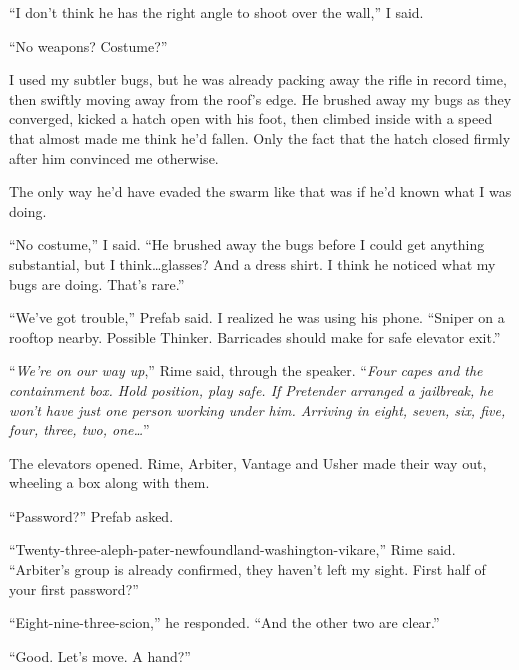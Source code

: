 ``I don't think he has the right angle to shoot over the wall,'' I said.



``No weapons?  Costume?''



I used my subtler bugs, but he was already packing away the rifle in record time, then swiftly moving away from the roof's edge.  He brushed away my bugs as they converged, kicked a hatch open with his foot, then climbed inside with a speed that almost made me think he'd fallen.  Only the fact that the hatch closed firmly after him convinced me otherwise.



The only way he'd have evaded the swarm like that was if he'd known what I was doing.



``No costume,'' I said.  ``He brushed away the bugs before I could get anything substantial, but I think\ldots glasses?  And a dress shirt.  I think he noticed what my bugs are doing.  That's rare.''



``We've got trouble,'' Prefab said.  I realized he was using his phone.  ``Sniper on a rooftop nearby.  Possible Thinker.  Barricades should make for safe elevator exit.''



``\emph{We're on our way up},'' Rime said, through the speaker.  ``\emph{Four capes and the containment box.  Hold position, play safe.  If Pretender arranged a jailbreak, he won't have just one person working under him.  Arriving in eight, seven, six, five, four, three, two, one\ldots}''



The elevators opened.  Rime, Arbiter, Vantage and Usher made their way out, wheeling a box along with them.



``Password?'' Prefab asked.



``Twenty-three-aleph-pater-newfoundland-washington-vikare,'' Rime said.  ``Arbiter's group is already confirmed, they haven't left my sight.  First half of your first password?''



``Eight-nine-three-scion,'' he responded.  ``And the other two are clear.''



``Good.  Let's move. A hand?''



